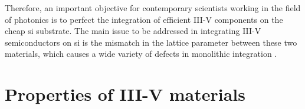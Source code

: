 Therefore, an important objective for contemporary scientists working in the field of photonics is to perfect the integration of efficient III-V components on the cheap \acl{si} substrate. The main issue to be addressed in integrating III-V semiconductors on \acl{si} is the mismatch in the lattice parameter between these two materials, which causes a wide variety of defects in monolithic integration \cite{Kunert2018}. 

\section{Properties of III-V materials}

\begin{figure}
    \centering
\end{figure}

